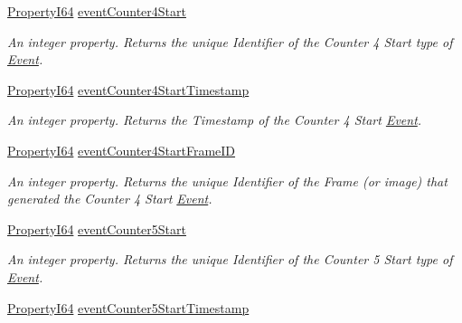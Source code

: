 \begin{DoxyCompactItemize}
\hyperlink{group___common_interface_ga81749b2696755513663492664a18a893}{Property\+I64} \hyperlink{classmv_i_m_p_a_c_t_1_1acquire_1_1_gen_i_cam_1_1_event_control_a86763dbf8a7b30e2cbb390cfa168662b}{event\+Counter4\+Start}
\begin{DoxyCompactList}\small\item\em An integer property. Returns the unique Identifier of the Counter 4 Start type of \hyperlink{classmv_i_m_p_a_c_t_1_1acquire_1_1_event}{Event}. \end{DoxyCompactList}\item 
\hyperlink{group___common_interface_ga81749b2696755513663492664a18a893}{Property\+I64} \hyperlink{classmv_i_m_p_a_c_t_1_1acquire_1_1_gen_i_cam_1_1_event_control_a44a6ff90746365b8b27a1814dcf37113}{event\+Counter4\+Start\+Timestamp}
\begin{DoxyCompactList}\small\item\em An integer property. Returns the Timestamp of the Counter 4 Start \hyperlink{classmv_i_m_p_a_c_t_1_1acquire_1_1_event}{Event}. \end{DoxyCompactList}\item 
\hyperlink{group___common_interface_ga81749b2696755513663492664a18a893}{Property\+I64} \hyperlink{classmv_i_m_p_a_c_t_1_1acquire_1_1_gen_i_cam_1_1_event_control_a1362ef1ce6721a6bd98e07d3fe6dfe37}{event\+Counter4\+Start\+Frame\+I\+D}
\begin{DoxyCompactList}\small\item\em An integer property. Returns the unique Identifier of the Frame (or image) that generated the Counter 4 Start \hyperlink{classmv_i_m_p_a_c_t_1_1acquire_1_1_event}{Event}. \end{DoxyCompactList}\item 
\hyperlink{group___common_interface_ga81749b2696755513663492664a18a893}{Property\+I64} \hyperlink{classmv_i_m_p_a_c_t_1_1acquire_1_1_gen_i_cam_1_1_event_control_a1a70b8a2838c691f9720d4ed4e8c48b6}{event\+Counter5\+Start}
\begin{DoxyCompactList}\small\item\em An integer property. Returns the unique Identifier of the Counter 5 Start type of \hyperlink{classmv_i_m_p_a_c_t_1_1acquire_1_1_event}{Event}. \end{DoxyCompactList}\item 
\hyperlink{group___common_interface_ga81749b2696755513663492664a18a893}{Property\+I64} \hyperlink{classmv_i_m_p_a_c_t_1_1acquire_1_1_gen_i_cam_1_1_event_control_a7e2c9af8cf6457d7529be46105df3a00}{event\+Counter5\+Start\+Timestamp}

\end{DoxyCompactItemize}

